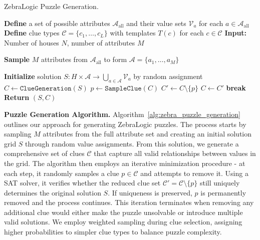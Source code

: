 \begin{algorithm}[H]
    \caption{ZebraLogic Puzzle Generation.}
    \label{alg:zebra_puzzle_generation}
    \begin{algorithmic}[1]
    \small 
    \State \textbf{Define} a set of possible attributes $\mathcal{A}_{\text{all}}$ and their value sets $\mathcal{V}_a$ for each $a \in \mathcal{A}_{\text{all}}$
    \State \textbf{Define} clue types $\mathcal{C} = \{c_1, \ldots, c_L\}$ with templates $T(c)$ for each $c \in \mathcal{C}$
    \State \textbf{Input:} Number of houses $N$, number of attributes $M$
    
    \State \textbf{Sample} $M$ attributes from $\mathcal{A}_{\text{all}}$ to form $\mathcal{A} = \{a_1, \ldots, a_M\}$
    
    \State \textbf{Initialize} solution $S: H \times \mathcal{A} \rightarrow \bigcup_{a \in \mathcal{A}} \mathcal{V}_a$ by random assignment
    \Statex \hrulefill
    \State $C \gets \texttt{ClueGeneration}(S)$ 
        \State $p \gets \texttt{SampleClue}(C)$ 
        \State $C' \gets C \setminus \{p\}$
            \State $C \gets C'$ 
        \Else
            \textbf{break}  
        \EndIf
    \EndWhile
    \State \textbf{Return} $(S, C)$ 
    \end{algorithmic}
\end{algorithm}

\textbf{Puzzle Generation Algorithm.}
Algorithm~\ref{alg:zebra_puzzle_generation} outlines our approach for generating ZebraLogic puzzles. 
The process starts by sampling $M$ attributes from the full attribute set and creating an initial solution grid $S$ through random value assignments. 
From this solution, we generate a comprehensive set of clues $\mathcal{C}$ that capture all valid relationships between values in the grid. 
The algorithm then employs an iterative minimization procedure - at each step, it randomly samples a clue $p \in \mathcal{C}$ and attempts to remove it. Using a SAT solver, it verifies whether the reduced clue set $\mathcal{C}' = \mathcal{C} \setminus \{p\}$ still uniquely determines the original solution $S$. If uniqueness is preserved, $p$ is permanently removed and the process continues. This iteration terminates when removing any additional clue would either make the puzzle unsolvable or introduce multiple valid solutions.
We employ weighted sampling during clue selection, assigning higher probabilities to simpler clue types to balance puzzle complexity.

